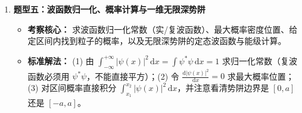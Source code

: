 \documentclass[zihao=5,a4paper,UTF8]{ctexart}
\newcommand{\dd}{\mathrm{d}}
\begin{document}
\begin{typebox}[量子力学初步常见题型分析]
\begin{enumerate}
    \begin{itemize}
        \item \textbf{考察核心：} 计算不同动能或加速电压下粒子的德布罗意波长（注意是否需相对论修正）；估算微观/宏观粒子位置或动量的不确定量。
        \item \textbf{标准解法：} 先比较 $E_k$ 与 $m_0 c^2$（电子静能 $0.511\ \mathrm{MeV}$）决定采用非相对论公式还是相对论通用公式；不确定性估算注意区分 $\Delta p$ 与 $\Delta\lambda$ 的微分关系（光子 $\Delta p = \frac{h}{\lambda^2}\Delta\lambda$）。
    \end{itemize}
    \item \textbf{题型五：波函数归一化、概率计算与一维无限深势阱}
    \begin{itemize}
        \item \textbf{考察核心：} 求波函数归一化常数（实/复波函数）、最大概率密度位置、给定区间内找到粒子的概率，以及无限深势阱的定态波函数与能级计算。
        \item \textbf{标准解法：} (1) 由 $\int_{-\infty}^{+\infty}|\psi(x)|^2\,\dd x = \int \psi^*\psi\,\dd x = 1$ 求归一化常数（复波函数必须用 $\psi^*\psi$，不能直接平方）；(2) 令 $\frac{\dd |\psi(x)|^2}{\dd x} = 0$ 求最大概率位置；(3) 对区间概率直接积分 $\int_{x_1}^{x_2}|\psi(x)|^2\,\dd x$，并注意看清势阱边界是 $[0, a]$ 还是 $[-a, a]$。
    \end{itemize}
\end{enumerate}
\end{typebox}
\end{document}
